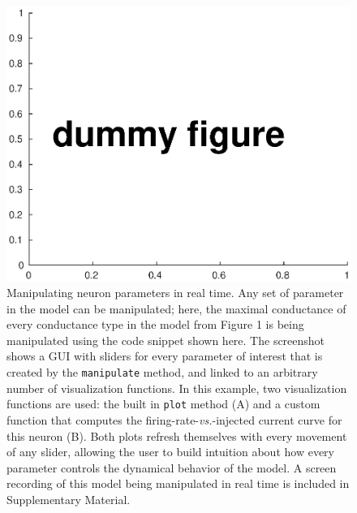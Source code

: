 \documentclass{frontiersSCNS} %
\newcommand{\vs}{\textit{vs.}\xspace}
\begin{document}
\begin{figure}
	\centering
	\includegraphics[width=1.0\linewidth]{gfx/figure_manipulate}
	\caption{Manipulating neuron parameters in real time. Any set of parameter in the model can be manipulated; here, the maximal conductance of every conductance type in the model from Figure 1 is being manipulated using the code snippet shown here. The screenshot shows a GUI with sliders for every parameter of interest that is created by the \texttt{manipulate} method, and linked to an arbitrary number of visualization functions. In this example, two visualization functions are used: the built in \texttt{plot} method (A) and a custom function that computes the firing-rate-\vs-injected current curve for this neuron (B). Both plots refresh themselves with every movement of any slider, allowing the user to build intuition about how every parameter controls the dynamical behavior of the model. A screen recording of this model being manipulated in real time is included in Supplementary Material. }
	\label{fig:figuremanipulate}
\end{figure}

\clearpage
\end{document}
